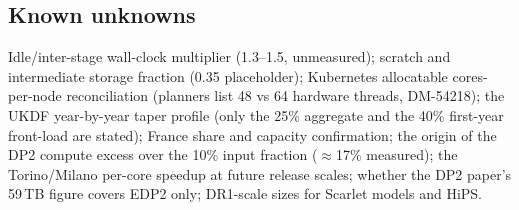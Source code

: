 \subsection{Known unknowns}\label{sec:ops2026unknowns}

Idle/inter-stage wall-clock multiplier (1.3--1.5, unmeasured); scratch and
intermediate storage fraction (0.35 placeholder); Kubernetes allocatable
cores-per-node reconciliation (planners list 48 vs 64 hardware threads,
DM-54218); the UKDF year-by-year taper profile (only the 25\% aggregate and
the 40\% first-year front-load are stated); France share and capacity
confirmation; the origin of the DP2 compute excess over the 10\% input
fraction ($\approx$17\% measured); the Torino/Milano per-core speedup at
future release scales; whether the DP2 paper's 59\,TB figure covers EDP2
only; DR1-scale sizes for Scarlet models and HiPS.
